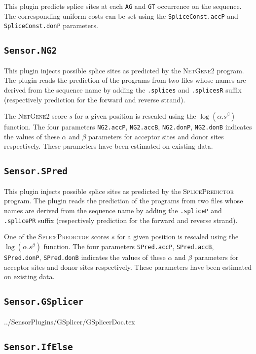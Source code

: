 \documentclass[a4paper,titlepage]{report}
\begin{document}
This plugin predicts splice sites at each \texttt{AG} and \texttt{GT}
occurrence on the sequence. The corresponding uniform costs can be set
using the \texttt{SpliceConst.accP} and \texttt{SpliceConst.donP}
parameters.

\subsection{\texttt{Sensor.NG2}}

This plugin injects possible splice sites as predicted by the
\textsc{NetGene2} program. The plugin reads the prediction of the
programs from two files whose names are derived from the sequence name
by adding the \texttt{.splices} and \texttt{.splicesR} suffix
(respectively prediction for the forward and reverse strand).

The \textsc{NetGene2} score $s$ for a given position is rescaled using
the $\log(\alpha.s^\beta)$ function. The four parameters \texttt{NG2.accP},
\texttt{NG2.accB}, \texttt{NG2.donP}, \texttt{NG2.donB}
indicates the values of these $\alpha$ and $\beta$ parameters for
acceptor sites and donor sites respectively. These parameters have
been estimated on existing data.

\subsection{\texttt{Sensor.SPred}}

This plugin injects possible splice sites as predicted by the
\textsc{SplicePredictor} program. The plugin reads the prediction of
the programs from two files whose names are derived from the sequence
name by adding the \texttt{.spliceP} and \texttt{.splicePR} suffix
(respectively prediction for the forward and reverse strand).

One of the \textsc{SplicePredictor} scores $s$ for a given position is
rescaled using the $\log(\alpha.s^\beta)$ function. The four parameters
\texttt{SPred.accP}, \texttt{SPred.accB}, \texttt{SPred.donP},
\texttt{SPred.donB} indicates the values of these $\alpha$ and $\beta$
parameters for acceptor sites and donor sites respectively.  These
parameters have been estimated on existing data.

\subsection{\texttt{Sensor.GSplicer}}
 {../SensorPlugins/GSplicer/GSplicerDoc.tex}

\subsection{\texttt{Sensor.IfElse}}
\end{document}
